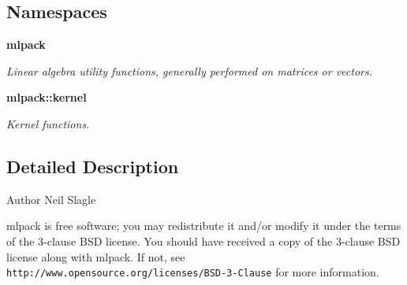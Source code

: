 \subsection*{Namespaces}
\begin{DoxyCompactItemize}
\item 
 \textbf{ mlpack}
\begin{DoxyCompactList}\small\item\em Linear algebra utility functions, generally performed on matrices or vectors. \end{DoxyCompactList}\item 
 \textbf{ mlpack\+::kernel}
\begin{DoxyCompactList}\small\item\em Kernel functions. \end{DoxyCompactList}\end{DoxyCompactItemize}


\subsection{Detailed Description}
\begin{DoxyAuthor}{Author}
Neil Slagle
\end{DoxyAuthor}
mlpack is free software; you may redistribute it and/or modify it under the terms of the 3-\/clause B\+SD license. You should have received a copy of the 3-\/clause B\+SD license along with mlpack. If not, see {\tt http\+://www.\+opensource.\+org/licenses/\+B\+S\+D-\/3-\/\+Clause} for more information. 